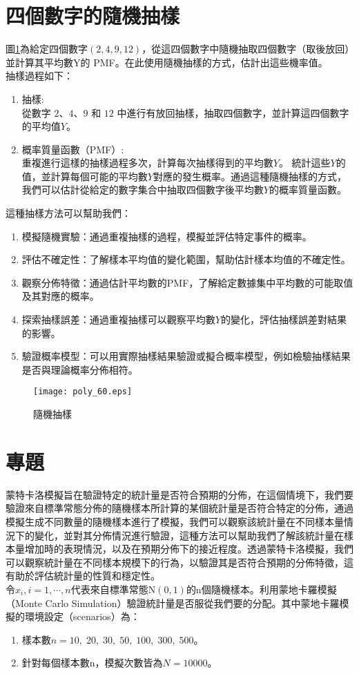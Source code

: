 \documentclass[12pt, a4paper]{article}
\begin{document}
\section{四個數字的隨機抽樣}
圖\;\ref{fig:poly_60.eps}\;為給定四個數字\;$(2, 4, 9, 12)$\;，從這四個數字中隨機抽取四個數字（取後放回）並計算其平均數\;Y\;的 PMF。在此使用隨機抽樣的方式，估計出這些機率值。\\
抽樣過程如下\;：
\begin{enumerate}
\item 抽樣\;:\\
從數字 $2$、$4$、$9$ 和 $12$ 中進行有放回抽樣，抽取四個數字，並計算這四個數字的平均值$Y$。
\item 概率質量函數（PMF）\;:\\
重複進行這樣的抽樣過程多次，計算每次抽樣得到的平均數$Y$。
統計這些$Y$的值，並計算每個可能的平均數$Y$對應的發生概率。通過這種隨機抽樣的方式，我們可以估計從給定的數字集合中抽取四個數字後平均數$Y$的概率質量函數。
\end{enumerate} 

這種抽樣方法可以幫助我們\;：
\begin{enumerate}
\item 模擬隨機實驗：通過重複抽樣的過程，模擬並評估特定事件的概率。
\item 評估不確定性：了解樣本平均值的變化範圍，幫助估計樣本均值的不確定性。
\item 觀察分佈特徵：通過估計平均數的PMF，了解給定數據集中平均數的可能取值及其對應的概率。
\item 探索抽樣誤差：通過重複抽樣可以觀察平均數$Y$的變化，評估抽樣誤差對結果的影響。
\item 驗證概率模型：可以用實際抽樣結果驗證或擬合概率模型，例如檢驗抽樣結果是否與理論概率分佈相符。
\end{enumerate}

\begin{figure}[H]
\centering
\texttt{[image: poly\_60.eps]}
\caption{隨機抽樣}
\label{fig:poly_60.eps}
\end{figure} 

\section{專題}
蒙特卡洛模擬旨在驗證特定的統計量是否符合預期的分佈，在這個情境下，我們要驗證來自標準常態分佈的隨機樣本所計算的某個統計量是否符合特定的分佈，通過模擬生成不同數量的隨機樣本進行了模擬，我們可以觀察該統計量在不同樣本量情況下的變化，並對其分佈情況進行驗證，這種方法可以幫助我們了解該統計量在樣本量增加時的表現情況，以及在預期分佈下的接近程度。透過蒙特卡洛模擬，我們可以觀察統計量在不同樣本規模下的行為，以驗證其是否符合預期的分佈特徵，這有助於評估統計量的性質和穩定性。\\
令\;${x_i, i=1,\cdots, n}$\;代表來自標準常態\;N$(0,1)$\;的\;n\;個隨機樣本。利用蒙地卡羅模擬（Monte Carlo Simulation）驗證統計量是否服從我們要的分配。其中蒙地卡羅模擬的環境設定（scenarios）為\;：\;
\begin{enumerate}
\item 樣本數\;$ n = 10,\;20,\;30,\;50,\;100,\;300,\;500$\;。
\item 針對每個樣本數\;n\;，模擬次數皆為\;$N=10000$\;。
\end{enumerate}
\end{document}

